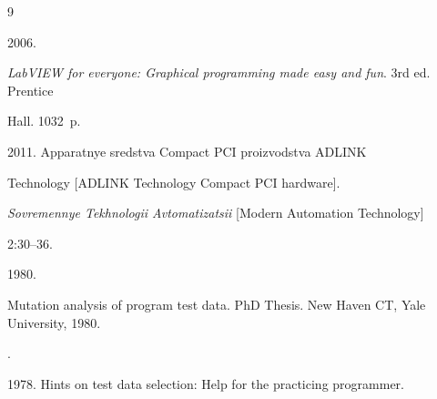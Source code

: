 



















\renewcommand{\bibname}{\protect\rmfamily References}





{\small\frenchspacing


{%




\begin{thebibliography}{9}










 2006.


\textit{LabVIEW for everyone: Graphical programming made easy and fun}. 3rd ed. Prentice


Hall. 1032~p.







 2011. Apparatnye sredstva Compact PCI proizvodstva ADLINK


Technology [ADLINK Technology Compact PCI hardware].


\textit{Sovremennye Tekhnologii Avtoma\-ti\-za\-tsii} [{Modern Automation Technology}]


2:30--36.







  1980.


Mutation analysis of program test data. PhD Thesis. New Haven CT, Yale University, 1980.




.


1978. Hints on test data selection: Help for the practicing programmer.



\end{thebibliography}}}
